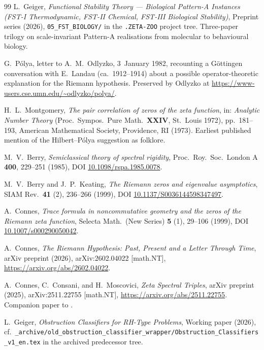 \documentclass[11pt]{article}
\theoremstyle{definition}
\theoremstyle{remark}
\begin{document}
\begin{thebibliography}{99}
L.~Geiger, \emph{Functional Stability Theory --- Biological
Pattern-A Instances (FST-I Thermodynamic, FST-II Chemical, FST-III
Biological Stability)}, Preprint series (2026),
\texttt{05\_FST\_BIOLOGY/}
in the \texttt{.ZETA-ZOO} project tree. Three-paper
trilogy on scale-invariant Pattern-A realisations from molecular
to behavioural biology.


G.~P\'olya, letter to A.~M.~Odlyzko, 3~January 1982, recounting a
Göttingen conversation with E.~Landau (ca.\ 1912--1914) about a
possible operator-theoretic explanation for the Riemann hypothesis.
Preserved by Odlyzko at
\url{https://www-users.cse.umn.edu/~odlyzko/polya/}.

H.~L.~Montgomery, \emph{The pair correlation of zeros of the zeta
function}, in: \emph{Analytic Number Theory} (Proc.\ Sympos.\ Pure
Math.\ \textbf{XXIV}, St.\ Louis 1972), pp.~181--193, American
Mathematical Society, Providence, RI (1973). Earliest published
mention of the Hilbert--P\'olya suggestion as folklore.

M.~V.~Berry, \emph{Semiclassical theory of spectral rigidity},
Proc.\ Roy.\ Soc.\ London A \textbf{400}, 229--251 (1985), DOI
\href{https://doi.org/10.1098/rspa.1985.0078}{10.1098/rspa.1985.0078}.

M.~V.~Berry and J.~P.~Keating, \emph{The Riemann zeros and
eigenvalue asymptotics}, SIAM Rev.\ \textbf{41} (2), 236--266 (1999),
DOI
\href{https://doi.org/10.1137/S0036144598347497}{10.1137/S0036144598347497}.

A.~Connes, \emph{Trace formula in noncommutative geometry and the
zeros of the Riemann zeta function}, Selecta Math.\ (New Series)
\textbf{5} (1), 29--106 (1999), DOI
\href{https://doi.org/10.1007/s000290050042}{10.1007/s000290050042}.

A.~Connes, \emph{The Riemann Hypothesis: Past, Present and a
Letter Through Time}, arXiv preprint (2026), arXiv:2602.04022
[math.NT], \url{https://arxiv.org/abs/2602.04022}.

A.~Connes, C.~Consani, and H.~Moscovici, \emph{Zeta Spectral
Triples}, arXiv preprint (2025), arXiv:2511.22755 [math.NT],
\url{https://arxiv.org/abs/2511.22755}. Companion paper to
\cite{Connes2026}.

L.~Geiger, \emph{Obstruction Classifiers for RH-Type Problems},
Working paper (2026), cf.\ \texttt{\_archive/old\_obstruction\_classifier\_wrapper/Obstruction\_Classifiers\_v1\_en.tex}
in the archived predecessor tree.


\end{thebibliography}
\end{document}
